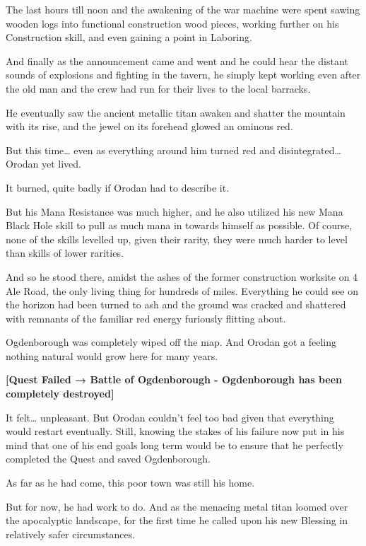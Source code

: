 \documentclass[a4paper,10pt]{book}
\begin{document}
\par
The last hours till noon and the awakening of the war machine were spent sawing wooden logs into functional construction wood pieces, working further on his Construction skill, and even gaining a point in Laboring.\par
And finally as the announcement came and went and he could hear the distant sounds of explosions and fighting in the tavern, he simply kept working even after the old man and the crew had run for their lives to the local barracks.\par
He eventually saw the ancient metallic titan awaken and shatter the mountain with its rise, and the jewel on its forehead glowed an ominous red.\par
But this time… even as everything around him turned red and disintegrated… Orodan yet lived.\par
It burned, quite badly if Orodan had to describe it.\par
But his Mana Resistance was much higher, and he also utilized his new Mana Black Hole skill to pull as much mana in towards himself as possible. Of course, none of the skills levelled up, given their rarity, they were much harder to level than skills of lower rarities.\par
And so he stood there, amidst the ashes of the former construction worksite on 4 Ale Road, the only living thing for hundreds of miles. Everything he could see on the horizon had been turned to ash and the ground was cracked and shattered with remnants of the familiar red energy furiously flitting about.\par
Ogdenborough was completely wiped off the map. And Orodan got a feeling nothing natural would grow here for many years.\par
\textbf{[Quest Failed → Battle of Ogdenborough - Ogdenborough has been completely destroyed]}\par
It felt… unpleasant. But Orodan couldn’t feel too bad given that everything would restart eventually. Still, knowing the stakes of his failure now put in his mind that one of his end goals long term would be to ensure that he perfectly completed the Quest and saved Ogdenborough.\par
As far as he had come, this poor town was still his home.\par
But for now, he had work to do. And as the menacing metal titan loomed over the apocalyptic landscape, for the first time he called upon his new Blessing in relatively safer circumstances.\par
\end{document}
